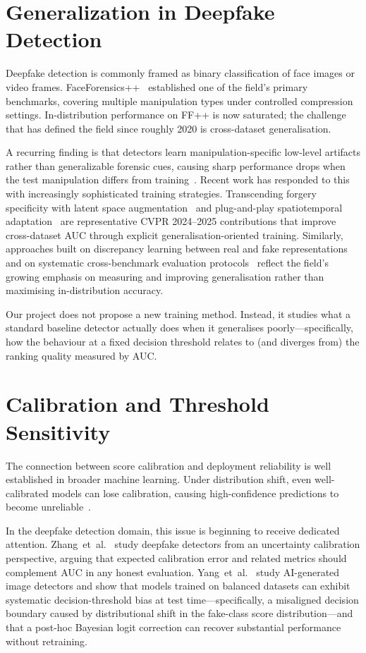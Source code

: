 \documentclass[a4paper,12pt]{report}
\begin{document}
\section{Generalization in Deepfake Detection}

Deepfake detection is commonly framed as binary
classification of face images or video frames.
FaceForensics++~\cite{rossler2019} established one of the
field's primary benchmarks, covering multiple manipulation
types under controlled compression settings.
In-distribution performance on FF++ is now saturated;
the challenge that has defined the field since roughly
2020 is cross-dataset generalisation.

A recurring finding is that detectors learn
manipulation-specific low-level artifacts rather than
generalizable forensic cues, causing sharp performance
drops when the test manipulation differs from
training~\cite{tolosana2020}.
Recent work has responded to this with increasingly
sophisticated training strategies.
Transcending forgery specificity with latent space
augmentation~\cite{lsda2024} and plug-and-play
spatiotemporal adaptation~\cite{p_and_p2025} are
representative CVPR 2024--2025 contributions that
improve cross-dataset AUC through explicit
generalisation-oriented training.
Similarly, approaches built on discrepancy learning
between real and fake representations~\cite{d3_2025}
and on systematic cross-benchmark evaluation
protocols~\cite{gend2025} reflect the field's growing
emphasis on measuring and improving generalisation
rather than maximising in-distribution accuracy.

Our project does not propose a new training method.
Instead, it studies what a standard baseline detector
actually does when it generalises poorly---specifically,
how the behaviour at a fixed decision threshold relates
to (and diverges from) the ranking quality measured by AUC.

\section{Calibration and Threshold Sensitivity}

The connection between score calibration and deployment
reliability is well established in broader machine learning.
Under distribution shift, even well-calibrated models can
lose calibration, causing high-confidence predictions
to become unreliable~\cite{calibration2025}.

In the deepfake detection domain, this issue is beginning
to receive dedicated attention.
Zhang~et~al.~\cite{calibration2025} study deepfake
detectors from an uncertainty calibration perspective,
arguing that expected calibration error and related
metrics should complement AUC in any honest evaluation.
Yang~et~al.~\cite{aigicalib2025} study AI-generated image
detectors and show that models trained on balanced datasets
can exhibit systematic decision-threshold bias at test
time---specifically, a misaligned decision boundary caused
by distributional shift in the fake-class score
distribution---and that a post-hoc Bayesian logit
correction can recover substantial performance without
retraining.
\end{document}
